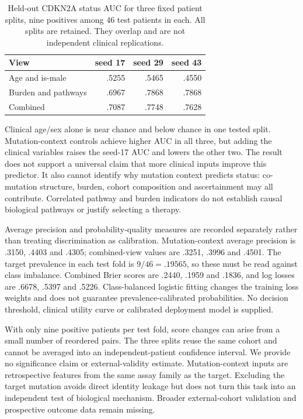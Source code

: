 \begin{table}[ht]\centering\small
\caption{Held-out CDKN2A status AUC for three fixed patient splits, nine positives among 46 test patients in each. All splits are retained. They overlap and are not independent clinical replications.}
\begin{tabular}{lrrr}\hline
View & seed 17 & seed 29 & seed 43\\\hline
Age and is-male & .5255 & .5465 & .4550\\
Burden and pathways & .6967 & .7868 & .7868\\
Combined & .7087 & .7748 & .7628\\\hline
\end{tabular}\end{table}

Clinical age/sex alone is near chance and below chance in one tested split. Mutation-context controls achieve higher AUC in all three, but adding the clinical variables raises the seed-17 AUC and lowers the other two. The result does not support a universal claim that more clinical inputs improve this predictor. It also cannot identify why mutation context predicts status: co-mutation structure, burden, cohort composition and ascertainment may all contribute. Correlated pathway and burden indicators do not establish causal biological pathways or justify selecting a therapy.

Average precision and probability-quality measures are recorded separately rather than treating discrimination as calibration. Mutation-context average precision is .3150, .4403 and .4305; combined-view values are .3251, .3996 and .4501. The target prevalence in each test fold is $9/46=.19565$, so these must be read against class imbalance. Combined Brier scores are .2440, .1959 and .1836, and log losses are .6678, .5397 and .5226. Class-balanced logistic fitting changes the training loss weights and does not guarantee prevalence-calibrated probabilities. No decision threshold, clinical utility curve or calibrated deployment model is supplied.

With only nine positive patients per test fold, score changes can arise from a small number of reordered pairs. The three splits reuse the same cohort and cannot be averaged into an independent-patient confidence interval. We provide no significance claim or external-validity estimate. Mutation-context inputs are retrospective features from the same assay family as the target. Excluding the target mutation avoids direct identity leakage but does not turn this task into an independent test of biological mechanism. Broader external-cohort validation and prospective outcome data remain missing.

